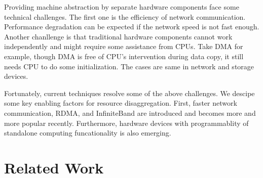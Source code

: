 \documentclass[twocolumn]{article}
\begin{document}
Providing machine abstraction by separate hardware components face some technical challenges\cite{Rack_scale_challenges}. The first one is the efficiency of network communication. Performance degradation can be expected if the network speed is not fast enough. Another chanllenge is that traditional hardware components cannot work independently and might require some assistance from CPUs. Take DMA for example, though DMA is free of CPU's intervention during data copy, it still needs CPU to do some initialization. The cases are same in network and storage devices.

Fortunately, current techniques resolve some of the above challenges. We descipe some key enabling factors for resource disaggregation. First, faster network communication\cite{R2C2}, RDMA\cite{RDMA}, and InfiniteBand\cite{InfiniteBand} are introduced and becomes more and more popular recently. Furthermore, hardware devices with programmablity of standalone computing funcationality is also emerging\cite{PARDIS, PIM}.

\section{Related Work}
\end{document}
